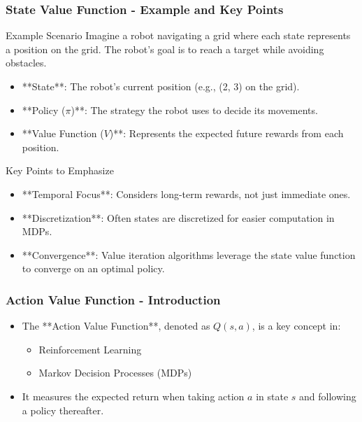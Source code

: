 \documentclass[aspectratio=169]{beamer}
\begin{document}
\begin{frame}[fragile]
    \frametitle{State Value Function - Example and Key Points}
    \begin{block}{Example Scenario}
        Imagine a robot navigating a grid where each state represents a position on the grid. The robot’s goal is to reach a target while avoiding obstacles.
    \end{block}
    
    \begin{itemize}
        \item **State**: The robot’s current position (e.g., (2, 3) on the grid).
        \item **Policy (\( \pi \))**: The strategy the robot uses to decide its movements.
        \item **Value Function (\( V \))**: Represents the expected future rewards from each position.
    \end{itemize}
    
    \begin{block}{Key Points to Emphasize}
        \begin{itemize}
            \item **Temporal Focus**: Considers long-term rewards, not just immediate ones.
            \item **Discretization**: Often states are discretized for easier computation in MDPs.
            \item **Convergence**: Value iteration algorithms leverage the state value function to converge on an optimal policy.
        \end{itemize}
    \end{block}
\end{frame}

\begin{frame}[fragile]
    \frametitle{Action Value Function - Introduction}
    \begin{itemize}
        \item The **Action Value Function**, denoted as \( Q(s, a) \), is a key concept in:
        \begin{itemize}
            \item Reinforcement Learning
            \item Markov Decision Processes (MDPs)
        \end{itemize}
        \item It measures the expected return when taking action \( a \) in state \( s \) and following a policy thereafter.
    \end{itemize}
\end{frame}
\end{document}
